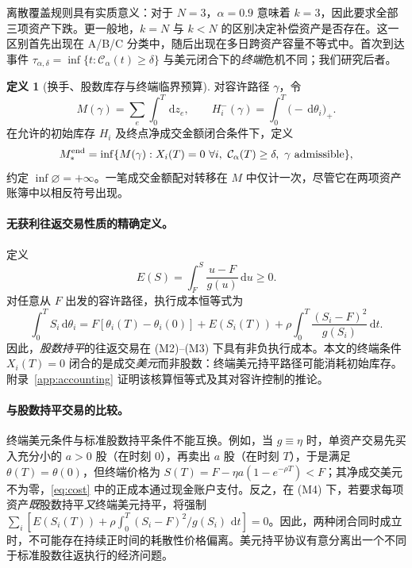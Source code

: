 \documentclass[11pt]{article}
\numberwithin{equation}{section}
\theoremstyle{definition}
\newtheorem{definition}[theorem]{定义}
\theoremstyle{remark}
\newcommand{\Cris}{\mathcal{C}}
\newcommand{\dd}{\,\mathrm{d}}
\begin{document}
离散覆盖规则具有实质意义：对于 $N=3$，$\alpha=0.9$ 意味着 $k=3$，因此要求全部三项资产下跌。更一般地，$k=N$ 与 $k<N$ 的区别决定补偿资产是否存在。这一区别首先出现在 A/B/C 分类中，随后出现在多日跨资产容量不等式中。首次到达事件 $\tau_{\alpha,\delta}=\inf\{t:\Cris_\alpha(t)\ge\delta\}$ 与美元闭合下的\emph{终端}危机不同；我们研究后者。

\begin{definition}[换手、股数库存与终端临界预算]\label{def:budget}
对容许路径 $\gamma$，令
\begin{equation}\label{eq:resource}
M(\gamma)=\sum_e\int_0^T\dd z_e,\qquad
H_i^-(\gamma)=\int_0^T\big(-\dd\theta_i\big)_+.
\end{equation}
在允许的初始库存 $H_i$ 及终点净成交金额闭合条件下，定义
\begin{equation}\label{eq:minbudget}
M_*^{\rm end}=\inf\{M(\gamma): X_i(T)=0\ \forall i,\ \Cris_\alpha(T)\ge\delta,\ \gamma\text{ admissible}\},
\end{equation}
约定 $\inf\varnothing=+\infty$。一笔成交金额配对转移在 $M$ 中仅计一次，尽管它在两项资产账簿中以相反符号出现。
\end{definition}

\paragraph{无获利往返交易性质的精确定义。} 定义
\begin{equation}\label{eq:E}
E(S)=\int_F^S\frac{u-F}{g(u)}\dd u\ge0.
\end{equation}
对任意从 $F$ 出发的容许路径，执行成本恒等式为
\begin{equation}\label{eq:cost}
\boxed{\int_0^T S_i\dd\theta_i=F[\theta_i(T)-\theta_i(0)]+E(S_i(T))
+\rho\int_0^T\frac{(S_i-F)^2}{g(S_i)}\dd t.}
\end{equation}
因此，\emph{股数持平}的往返交易在 (M2)--(M3) 下具有非负执行成本。本文的终端条件 $X_i(T)=0$ 闭合的是成交\emph{美元}而非股数：终端美元持平路径可能消耗初始库存。附录~\ref{app:accounting} 证明该核算恒等式及其对容许控制的推论。

\paragraph{与股数持平交易的比较。}
终端美元条件与标准股数持平条件不能互换。例如，当 $g\equiv\eta$ 时，单资产交易先买入充分小的 $a>0$ 股（在时刻 $0$），再卖出 $a$ 股（在时刻 $T$），于是满足 $\theta(T)=\theta(0)$，但终端价格为 $S(T)=F-\eta a(1-e^{-\rho T})<F$；其净成交美元不为零，\eqref{eq:cost} 中的正成本通过现金账户支付。反之，在 (M4) 下，若要求每项资产\emph{既}股数持平\emph{又}终端美元持平，将强制 $\sum_i[E(S_i(T))+\rho\int_0^T(S_i-F)^2/g(S_i)\,\dd t]=0$。因此，两种闭合同时成立时，不可能存在持续正时间的耗散性价格偏离。美元持平协议有意分离出一个不同于标准股数往返执行的经济问题。
\end{document}
